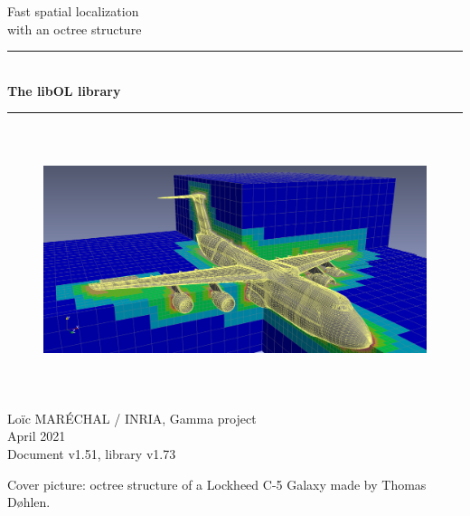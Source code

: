 \documentclass[a4paper,12pt]{article}
\newcommand{\HRule}{\rule{\linewidth}{1mm}}
\begin{document}
%
%

\begin{titlepage}

\begin{center}
\huge Fast spatial localization \\ with an octree structure
\HRule \\
\medskip
{\Huge \bfseries The libOL library} \\
\HRule
\end{center}


\begin{figure}[htbp]
\begin{center}
\includegraphics[height=7.8cm]{octree_mesh.png}
\end{center}
\end{figure}


\begin{flushright}
\Large Lo\"ic MAR\'ECHAL / INRIA, Gamma project\\
\Large April 2021 \\
\normalsize Document v1.51, library v1.73
\end{flushright}

\end{titlepage}

\clearpage

\setcounter{tocdepth}{2}
\renewcommand*\contentsname{Table of contents}
\tableofcontents
\vfill

\footnotesize{Cover picture: octree structure of a Lockheed C-5 Galaxy made by Thomas Døhlen.}
\normalsize

\clearpage
\end{document}
